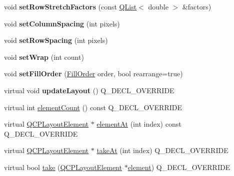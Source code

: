 \begin{DoxyCompactItemize}
\item 
\mbox{\label{class_q_c_p_layout_grid_a200b45f9c908f96ebadaa3c8d87a2782}} 
void {\bfseries set\+Row\+Stretch\+Factors} (const \hyperlink{class_q_list}{Q\+List}$<$ double $>$ \&factors)
\item 
\mbox{\label{class_q_c_p_layout_grid_a3a49272aba32bb0fddc3bb2a45a3dba0}} 
void {\bfseries set\+Column\+Spacing} (int pixels)
\item 
\mbox{\label{class_q_c_p_layout_grid_aaef2cd2d456197ee06a208793678e436}} 
void {\bfseries set\+Row\+Spacing} (int pixels)
\item 
\mbox{\label{class_q_c_p_layout_grid_ab36af18d77e4428386d02970382ee598}} 
void {\bfseries set\+Wrap} (int count)
\item 
\mbox{\label{class_q_c_p_layout_grid_affc2f3cfd22f28698c5b29b960d2a391}} 
void {\bfseries set\+Fill\+Order} (\hyperlink{class_q_c_p_layout_grid_a7d49ee08773de6b2fd246edfed353cca}{Fill\+Order} order, bool rearrange=true)
\item 
\mbox{\label{class_q_c_p_layout_grid_aabc84d32716b12488540803d716fbc80}} 
virtual void {\bfseries update\+Layout} () Q\+\_\+\+D\+E\+C\+L\+\_\+\+O\+V\+E\+R\+R\+I\+DE
\item 
virtual int \hyperlink{class_q_c_p_layout_grid_a9a8942aface780a02445ebcf14c48513}{element\+Count} () const Q\+\_\+\+D\+E\+C\+L\+\_\+\+O\+V\+E\+R\+R\+I\+DE
\item 
virtual \hyperlink{class_q_c_p_layout_element}{Q\+C\+P\+Layout\+Element} $\ast$ \hyperlink{class_q_c_p_layout_grid_a8b420c8ecfcd5cfb3673c2dfa0577286}{element\+At} (int index) const Q\+\_\+\+D\+E\+C\+L\+\_\+\+O\+V\+E\+R\+R\+I\+DE
\item 
virtual \hyperlink{class_q_c_p_layout_element}{Q\+C\+P\+Layout\+Element} $\ast$ \hyperlink{class_q_c_p_layout_grid_a6c649e95e9550f671ca130d7ebc97feb}{take\+At} (int index) Q\+\_\+\+D\+E\+C\+L\+\_\+\+O\+V\+E\+R\+R\+I\+DE
\item 
virtual bool \hyperlink{class_q_c_p_layout_grid_a97b7dbaae963fc34bd7427318dab8861}{take} (\hyperlink{class_q_c_p_layout_element}{Q\+C\+P\+Layout\+Element} $\ast$\hyperlink{class_q_c_p_layout_grid_a602b426609b4411cf6a93c3ddf3a381a}{element}) Q\+\_\+\+D\+E\+C\+L\+\_\+\+O\+V\+E\+R\+R\+I\+DE

\end{DoxyCompactItemize}
